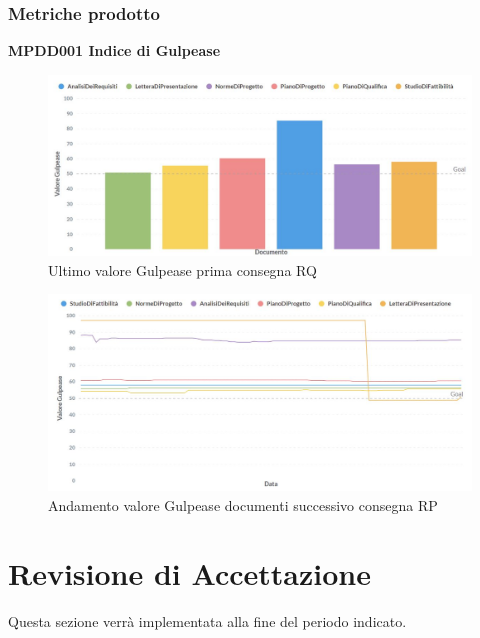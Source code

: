 \documentclass[PianoDiQualifica.tex]{subfiles}
\begin{document}
\subsubsection{Metriche prodotto}
\textbf{MPDD001 Indice di Gulpease}
\begin{figure}[htbp]
	\centering
	\includegraphics[width=1\linewidth]{RP/gulpease}
	\caption{Ultimo valore Gulpease prima consegna RQ}
	\label{fig:processi}
\end{figure}
\begin{figure}[htbp]
	\centering
	\includegraphics[width=1\linewidth]{RP/gulpeasegrid}
	\caption{Andamento valore Gulpease documenti successivo consegna RP}
	\label{fig:processi}
\end{figure}

\section{Revisione di Accettazione}
Questa sezione verrà implementata alla fine del periodo indicato.
\end{document}
